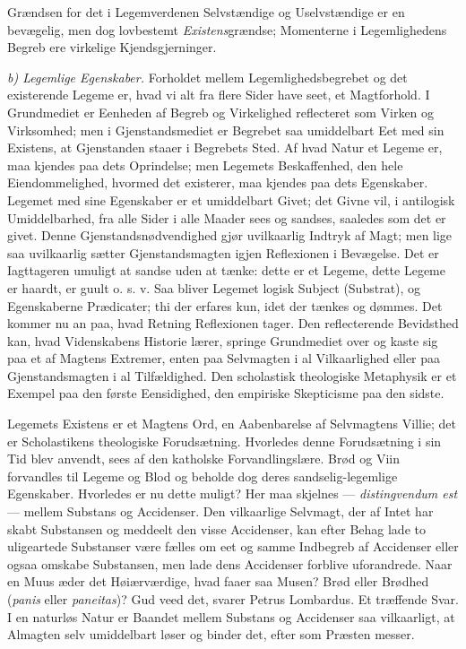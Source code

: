 \documentclass[12pt,a4paper]{book}
\newcommand{\runin}[1]{\emph{#1}\hspace{0.4em}}
\begin{document}
Grændsen for det i Legemverdenen Selvstændige og Uselvstændige er en
bevægelig, men dog lovbestemt \emph{Existens}grændse; Momenterne i
Legemlighedens Begreb ere virkelige Kjendsgjerninger.

\runin{b) Legemlige Egenskaber.} Forholdet mellem
Legemlighedsbegrebet og det existerende Legeme er, hvad vi alt fra
flere Sider have seet, et Magtforhold. I Grundmediet er Eenheden af
Begreb og Virkelighed reflecteret som Virken og Virksomhed; men i
Gjenstandsmediet er Begrebet saa umiddelbart Eet med sin Existens, at
Gjenstanden staaer i Begrebets Sted. Af hvad Natur et Legeme er, maa
kjendes paa dets Oprindelse; men Legemets Beskaffenhed, den hele
Eiendommelighed, hvormed det existerer, maa kjendes paa dets
Egenskaber. Legemet med sine Egenskaber er et umiddelbart Givet; det
Givne vil, i antilogisk Umiddelbarhed, fra alle Sider i alle Maader
sees og sandses, saaledes som det er givet. Denne
Gjenstandsnødvendighed gjør uvilkaarlig Indtryk af Magt; men lige saa
uvilkaarlig sætter Gjenstandsmagten igjen Reflexionen i Bevægelse. Det
er Iagttageren umuligt at sandse uden at tænke: dette er et Legeme,
dette Legeme er haardt, er guult o. s. v. Saa bliver Legemet logisk
Subject (Substrat), og Egenskaberne Prædicater; thi der erfares kun,
idet der tænkes og dømmes. Det kommer nu an paa, hvad Retning
Reflexionen tager. Den reflecterende Bevidsthed kan, hvad
Videnskabens Historie lærer,
springe Grundmediet over og kaste sig paa et af Magtens Extremer,
enten paa Selvmagten i al Vilkaarlighed eller paa Gjenstandsmagten i
al Tilfældighed. Den scholastisk theologiske Metaphysik er et Exempel
paa den første Eensidighed, den empiriske Skepticisme paa den sidste.

Legemets Existens er et Magtens Ord, en Aabenbarelse af Selvmagtens
Villie; det er Scholastikens theologiske Forudsætning. Hvorledes denne
Forudsætning i sin Tid blev anvendt, sees af den katholske
Forvandlingslære. Brød og Viin forvandles til Legeme og Blod og
beholde dog deres sandselig-legemlige Egenskaber. Hvorledes er nu
dette muligt? Her maa skjelnes --- \textit{distingvendum est} ---
mellem Substans og Accidenser. Den vilkaarlige Selvmagt, der af Intet
har skabt Substansen og meddeelt den visse Accidenser, kan efter Behag
lade to uligeartede Substanser være fælles om eet og samme Indbegreb
af Accidenser eller ogsaa omskabe Substansen, men lade dens
Accidenser forblive uforandrede. Naar en Muus æder det
Høiærværdige, hvad faaer saa Musen? Brød eller Brødhed
(\textit{panis} eller \textit{paneitas})? Gud veed det, svarer Petrus
Lombardus. Et træffende Svar. I en naturløs Natur er Baandet mellem
Substans og Accidenser saa vilkaarligt, at Almagten selv umiddelbart
løser og binder det, efter som Præsten messer.
\end{document}
